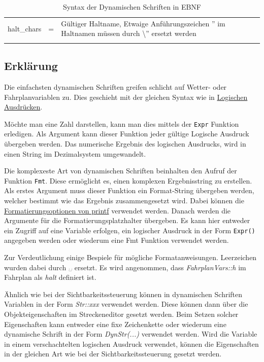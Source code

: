 \begin{longtable}[c]{@{}lll@{}}
\begin{minipage}[t]{0.17\columnwidth}\raggedright
halt\_chars
\end{minipage} & \begin{minipage}[t]{0.06\columnwidth}\raggedright
=
\end{minipage} & \begin{minipage}[t]{0.78\columnwidth}\raggedright
Gültiger Haltname, Etwaige Anführungszeichen '' im Haltnamen müssen durch \textbackslash{}'' ersetzt werden
\end{minipage}
\\\noalign{\medskip}
\hline
\noalign{\medskip}
\caption{Syntax der Dynamischen Schriften in EBNF}
\end{longtable}

\subsection{Erklärung}

Die einfachsten dynamischen Schriften greifen schlicht auf Wetter- oder
Fahrplanvariablen zu. Dies geschieht mit der gleichen Syntax wie in
\hyperref[sec.editor.obj.logischeausdruecke]{Logischen Ausdrücken}.

Möchte man eine Zahl darstellen, kann man dies mittels der \texttt{Expr}
Funktion erledigen. Als Argument kann dieser Funktion jeder gültige
Logische Ausdruck übergeben werden. Das numerische Ergebnis des
logischen Ausdrucks, wird in einen String im Dezimalsystem umgewandelt.

Die komplexeste Art von dynamischen Schriften beinhalten den Aufruf der
Funktion \texttt{Fmt}. Diese ermöglicht es, einen komplexen
Ergebnisstring zu erstellen. Als erstes Argument muss dieser Funktion
ein Format-String übergeben werden, welcher bestimmt wie das Ergebnis
zusammengesetzt wird. Dabei können die \href{http://en.wikipedia.org/wiki/Printf#Format_placeholders}{Formatierungsoptionen
von printf} verwendet werden. Danach werden die Argumente für die
Formatierungsplatzhalter übergeben. Es kann hier entweder ein Zugriff
auf eine Variable erfolgen, ein logischer Ausdruck in der Form
\texttt{Expr()} angegeben werden oder wiederum eine Fmt Funktion
verwendet werden.

Zur Verdeutlichung einige Bespiele für mögliche Formatanweisungen.
Leerzeichen wurden dabei durch \emph{␣} ersetzt. Es wird angenommen,
dass \emph{FahrplanVars::h} im Fahrplan als \emph{halt} definiert ist.

\label{sec:editor-obj-dynstr-params}
Ähnlich wie bei der Sichtbarkeitssteuerung können in dynamischen Schriften Variablen in der Form \emph{Str::xxx} verwendet werden. Diese können dann über die Objekteigenschaften im Streckeneditor gesetzt werden. Beim Setzen solcher Eigenschaften kann entweder eine fixe Zeichenkette oder wiederum eine dynamische Schrift in der Form \emph{DynStr(...)} verwendet werden. Wird die Variable in einem verschachtelten logischen Ausdruck verwendet, können die Eigenschaften in der gleichen Art wie bei der Sichtbarkeitssteuerung gesetzt werden.

